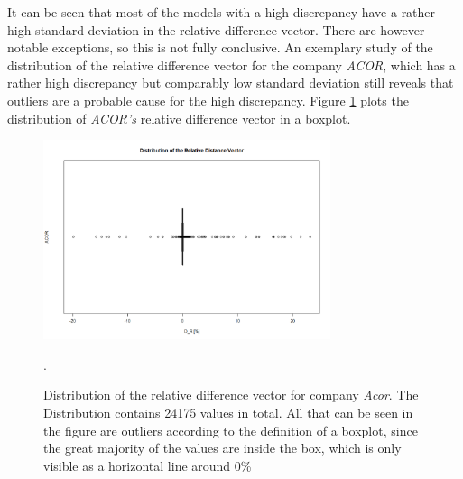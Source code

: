It can be seen that most of the models with a high discrepancy have a rather high standard deviation in the relative difference vector. There are however notable exceptions, so this is not fully conclusive. An exemplary study of the distribution of the relative difference vector for the company \textit{ACOR}, which has a rather high discrepancy but comparably low standard deviation still reveals that outliers are a probable cause for the high discrepancy. Figure \ref{fig_acorDRDistribution} plots the distribution of \textit{ACOR's} relative difference vector in a boxplot.

\begin{figure}[h]
	\centering
  	\includegraphics[width=0.75\textwidth]{acorDRDistribution}
	\caption{Distribution of the relative difference vector for company \textit{Acor}. The Distribution contains 24175 values in total. All that can be seen in the figure are outliers according to the definition of a boxplot, since the great majority of the values are inside the box, which is only visible as a horizontal line around 0\%}.
	\label{fig_acorDRDistribution}
\end{figure}

